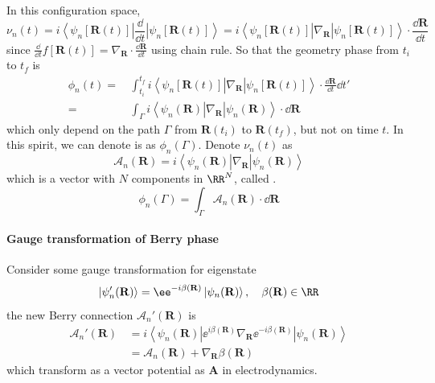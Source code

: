 \documentclass[12pt,a4paper]{article}
\newcommand{\bra}[1]{\left\langle{#1}\right|}
\newcommand{\ket}[1]{\left|{#1}\right\rangle}
\begin{document}
    In this configuration space,
    \[ \nu_n(t) = i \bra{\psi_n[\mathbf{R}(t)]} \frac{\dd}{\dd t} \ket{\psi_n[\mathbf{R}(t)]}
    = i \bra{\psi_n[\mathbf{R}(t)]} \nabla_{\mathbf{R}} \ket{\psi_n[\mathbf{R}(t)]} \cdot \frac{\dd \mathbf{R}}{\dd t} \]
    since $\frac{\dd}{\dd t} f[\mathbf{R}(t)] = \nabla_{\mathbf{R}} \cdot \frac{\dd \mathbf{R}}{\dd t}$ using chain rule. So that the geometry phase from $t_i$ to $t_f$ is
    \[\begin{aligned}
        \phi_n(t)
        = &\, \int_{t_i}^{t_f} i \bra{\psi_n[\mathbf{R}(t)]} \nabla_{\mathbf{R}} \ket{\psi_n[\mathbf{R}(t)]} \cdot \frac{\dd \mathbf{R}}{\dd t} \dd t' \\
        = &\, \int_{\Gamma} i \bra{\psi_n(\mathbf{R})} \nabla_{\mathbf{R}} \ket{\psi_n(\mathbf{R})} \cdot \dd \mathbf{R}
    \end{aligned}\]
    which only depend on the path $\Gamma$ from $\mathbf{R}(t_i)$ to $\mathbf{R}(t_f)$, but not on time $t$. In this spirit, we can denote is as $\phi_n(\Gamma)$. Denote $\nu_n(t)$ as
    \begin{equation}
    \label{eq:A}
        \mathcal{A}_n(\mathbf{R}) = i \bra{\psi_n(\mathbf{R})} \nabla_{\mathbf{R}} \ket{\psi_n(\mathbf{R})}
    \end{equation}
    which is a vector with $N$ components in $\RR^N$, called .
    \begin{equation}
    \label{eq:phi_A}
        \phi_n(\Gamma) = \int_{\Gamma} \mathcal{A}_n(\mathbf{R}) \cdot \dd \mathbf{R}
    \end{equation}

\paragraph{Gauge transformation of Berry phase}

    Consider some gauge transformation for eigenstate
    \[ \ket{\psi_n'(\mathbf{R})} = \ee^{-i\beta(\mathbf{R})} \ket{\psi_n(\mathbf{R})}, \quad \beta(\mathbf{R})\in \RR \]
    the new Berry connection $\mathcal{A}_n'(\mathbf{R})$ is
    \[\begin{aligned}
        \mathcal{A}_n'(\mathbf{R})
        &\, = i \bra{\psi_n(\mathbf{R})} \ee^{i\beta(\mathbf{R})} \nabla_{\mathbf{R}} \ee^{-i\beta(\mathbf{R})}\ket{\psi_n(\mathbf{R})} \\
        &\, = \mathcal{A}_n(\mathbf{R}) + \nabla_{\mathbf{R}} \beta(\mathbf{R})
    \end{aligned}\]
    which transform as a vector potential as $\mathbf{A}$ in electrodynamics.
\end{document}
